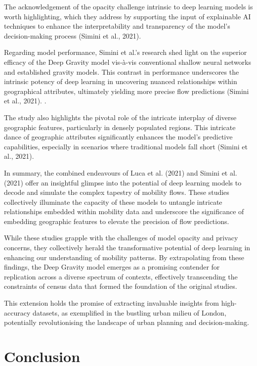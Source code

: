     The acknowledgement of the opacity challenge intrinsic to deep learning models is worth highlighting, which they address by supporting the input of explainable AI techniques to enhance the interpretability and transparency of the model's decision-making process (Simini et al., 2021).

    Regarding model performance, Simini et al.'s research shed light on the superior efficacy of the Deep Gravity model vis-à-vis conventional shallow neural networks and established gravity models. This contrast in performance underscores the intrinsic potency of deep learning in uncovering nuanced relationships within geographical attributes, ultimately yielding more precise flow predictions (Simini et al., 2021). .

    The study also highlights the pivotal role of the intricate interplay of diverse geographic features, particularly in densely populated regions. This intricate dance of geographic attributes significantly enhances the model's predictive capabilities, especially in scenarios where traditional models fall short (Simini et al., 2021).

    In summary, the combined endeavours of Luca et al. (2021) and Simini et al. (2021) offer an insightful glimpse into the potential of deep learning models to decode and simulate the complex tapestry of mobility flows. These studies collectively illuminate the capacity of these models to untangle intricate relationships embedded within mobility data and underscore the significance of embedding geographic features to elevate the precision of flow predictions.

    While these studies grapple with the challenges of model opacity and privacy concerns, they collectively herald the transformative potential of deep learning in enhancing our understanding of mobility patterns. By extrapolating from these findings, the Deep Gravity model emerges as a promising contender for replication across a diverse spectrum of contexts, effectively transcending the constraints of census data that formed the foundation of the original studies. 

    This extension holds the promise of extracting invaluable insights from high-accuracy datasets, as exemplified in the bustling urban milieu of London, potentially revolutionising the landscape of urban planning and decision-making.



    \section{Conclusion}

